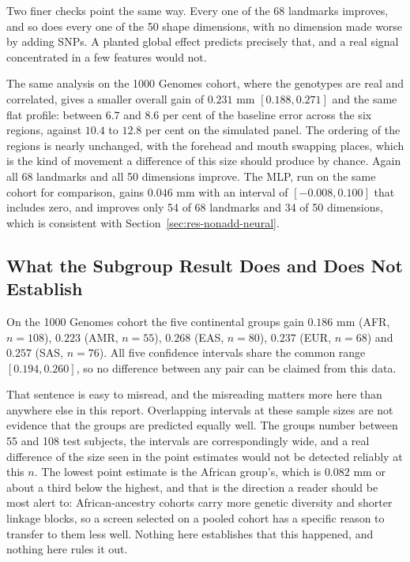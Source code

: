 Two finer checks point the same way. Every one of the 68 landmarks improves, and so does every one of the 50 shape dimensions, with no dimension made worse by adding SNPs. A planted global effect predicts precisely that, and a real signal concentrated in a few features would not.

The same analysis on the 1000 Genomes cohort, where the genotypes are real and correlated, gives a smaller overall gain of $0.231$ mm $[0.188, 0.271]$ and the same flat profile: between $6.7$ and $8.6$ per cent of the baseline error across the six regions, against $10.4$ to $12.8$ per cent on the simulated panel. The ordering of the regions is nearly unchanged, with the forehead and mouth swapping places, which is the kind of movement a difference of this size should produce by chance. Again all 68 landmarks and all 50 dimensions improve. The MLP, run on the same cohort for comparison, gains $0.046$ mm with an interval of $[-0.008, 0.100]$ that includes zero, and improves only 54 of 68 landmarks and 34 of 50 dimensions, which is consistent with Section~\ref{sec:res-nonadd-neural}.

\subsection{What the Subgroup Result Does and Does Not Establish}
\label{sec:res-fairness}
On the 1000 Genomes cohort the five continental groups gain $0.186$ mm (AFR, $n=108$), $0.223$ (AMR, $n=55$), $0.268$ (EAS, $n=80$), $0.237$ (EUR, $n=68$) and $0.257$ (SAS, $n=76$). All five confidence intervals share the common range $[0.194, 0.260]$, so no difference between any pair can be claimed from this data.

That sentence is easy to misread, and the misreading matters more here than anywhere else in this report. Overlapping intervals at these sample sizes are not evidence that the groups are predicted equally well. The groups number between 55 and 108 test subjects, the intervals are correspondingly wide, and a real difference of the size seen in the point estimates would not be detected reliably at this $n$. The lowest point estimate is the African group's, which is $0.082$ mm or about a third below the highest, and that is the direction a reader should be most alert to: African-ancestry cohorts carry more genetic diversity and shorter linkage blocks, so a screen selected on a pooled cohort has a specific reason to transfer to them less well. Nothing here establishes that this happened, and nothing here rules it out.

